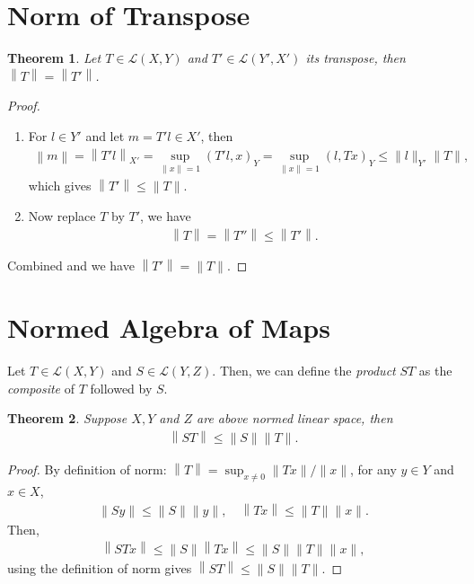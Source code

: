 \documentclass[10pt]{book}
\newtheorem{theorem}{Theorem}[chapter]
\theoremstyle{definition}
\numberwithin{equation}{chapter}
\begin{document}
\medskip

\section{Norm of Transpose}
\begin{theorem}
Let $T \in \mathscr{L}(X, Y)$ and $T' \in \mathscr{L}(Y', X')$ its transpose, then $\left\|T\right\| = \left\|T'\right\|$.
\end{theorem}
\begin{proof}
~\begin{enumerate}[label=(\alph*)]
    \item For $l \in Y'$ and let $m = T'l \in X'$, then
    \begin{align*}
        \left\|m\right\| = \left\|T'l\right\|_{X'} = \sup_{\|x\|=1} \left(T'l, x\right)_{Y} =  \sup_{\|x\|=1} \left(l, Tx\right)_{Y} \leq \|l\|_{Y'} \|T\|, 
    \end{align*}
    which gives $\left\|T'\right\| \leq \|T\|$.
    
    \item Now replace $T$ by $T'$, we have
    \begin{align*}
        \left\|T\right\| = \left\|T''\right\| \leq \left\|T'\right\|.
    \end{align*}
\end{enumerate}
Combined and we have $\left\|T'\right\| = \|T\|$.
\end{proof}

\medskip

\section{Normed Algebra of Maps}

Let $T \in \mathscr{L}(X, Y)$ and $S \in \mathscr{L}(Y, Z)$. Then, we can define the {\em product} $ST$ as the {\em composite} of $T$ followed by $S$.

\medskip

\begin{theorem}
Suppose $X, Y$ and $Z$ are above normed linear space, then 
\begin{align*}
    \left\|ST\right\| \leq \|S\| \|T\|.
\end{align*}
\end{theorem}
\begin{proof}
By definition of norm: $\left\|T\right\| = \sup_{x \neq 0} \|Tx\|/\|x\|$, for any $y \in Y$ and $x \in X$, 
\begin{align*}
    \left\|Sy\right\| \leq \|S\| \|y\|, \quad \left\|Tx\right\| \leq \|T\| \|x\|.
\end{align*}
Then,
\begin{align*}
    \left\|STx\right\| \leq \|S\| \left\|Tx\right\| \leq \|S\| \|T\| \|x\|,
\end{align*}
using the definition of norm gives $\left\|ST\right\| \leq \|S\| \|T\|$.
\end{proof}
\end{document}
